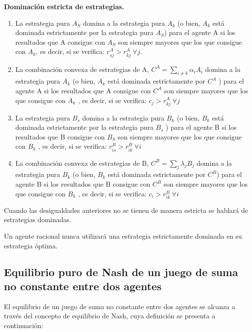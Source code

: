 \begin{definicion}
\textbf{Dominación estricta de estrategias.}

\begin{enumerate}
    \item La estrategia pura $A_S$ domina a la estrategia pura $A_k$ (o bien, $A_k$ está dominada estrictamente por la estrategia pura $A_S$) para el agente A si los resultados que A consigue con $A_S$ son siempre mayores que los que consigue con $A_k$, es decir, si se verifica: $r_{sj}^A > r_{kj}^A \: \forall j$.
    \item La combinación convexa de estrategias de A, $C^A = \underset{i \neq k}{\sum}\alpha_iA_i $ domina a la estrategia pura $A_k$ (o bien, $A_k$ está dominada estrictamente por $C^A$ ) para el agente A si los resultados que A consigue con $C^A$ son siempre mayores que los que consigue con $A_k$ , es decir, si se verifica: $c_j>r_{kj}^A \: \forall j$
    \item La estrategia pura $B_s$ domina a la estrategia pura $B_k$ (o bien, $B_k$ está dominada estrictamente por la estrategia pura $B_s$ ) para el agente B si los resultados que B consigue con $B_S$ son siempre mayores que los que consigue con $B_k$ , es decir, si se verifica: $r_{is}^B > r_{ik}^B \: \forall i$
    \item La combinación convexa de estrategias de B, $C^B = \underset{j}{\sum}\lambda_jB_j $ domina a la estrategia pura $B_k$ (o bien, $B_k$ está dominada estrictamente por $C^B$) para el agente B si los resultados que B consigue con $C^B$ son siempre mayores que los que consigue con $B_k$ , es decir, si se verifica: $c_i>r_{ik}^B \: \forall i$

\end{enumerate}
Cuando las desigualdades anteriores no se tienen de manera estricta se hablará de estrategias dominadas.
\end{definicion}

\begin{proposicion}
Un agente racional nunca utilizará una estrategia estrictamente dominada en su estrategia óptima.
\end{proposicion}

\subsection{Equilibrio puro de Nash de un juego de suma no constante entre dos agentes}
El equilibrio de un juego de suma no constante entre dos agentes se alcanza a través del concepto de equilibrio de Nash, cuya definición se presenta a continuación:\\


